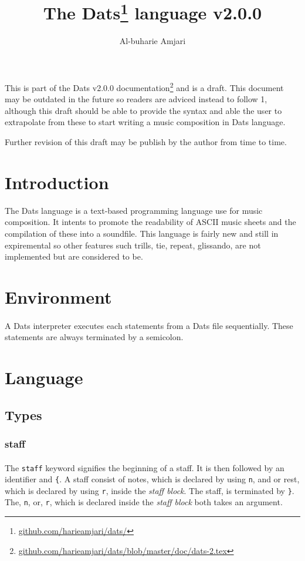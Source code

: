 \documentclass{article}
\title{\textbf{The Dats\thanks{\url{github.com/harieamjari/dats/}} language v2.0.0}}
\author{Al-buharie Amjari}
\begin{document}
\maketitle

\abstract
This is part of the Dats v2.0.0 documentation\footnote{\url{github.com/harieamjari/dats/blob/master/doc/dats-2.tex}} and is a draft. This document may be outdated in the future so readers are adviced instead to follow 1, although this draft should be able to provide the syntax and able the user to extrapolate from these to
start writing a music composition in Dats language.

Further revision of this draft may be publish by the author from time to time.


\section{Introduction}

\indent The Dats language is a text-based programming language use for music composition.  
It intents to promote the readability of ASCII music sheets and the compilation of these into
 a soundfile.
This language is fairly new and still in expiremental so other features such trills, tie,
repeat, glissando, are not implemented but are considered to be.



\section{Environment}
 \paragraph{} A Dats interpreter executes each statements from a Dats file sequentially. These
statements are always terminated by a semicolon.

\section{Language}
\subsection{Types}
\subsubsection{staff}
\paragraph{} The \verb+staff+ keyword signifies the beginning of a staff. It is then followed by an identifier and \verb+{+. A staff consist of
notes, which is declared by using \verb+n+, and or rest, which is declared by using \verb+r+, inside the \textit{staff block}. The staff, is terminated by \verb+}+. The, \verb+n+, or, \verb+r+, which is declared inside the \textit{staff block} both takes an argument.
\end{document}
